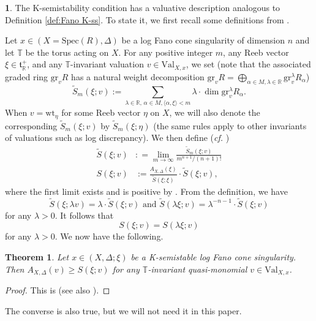 \documentclass[12pt]{amsart}
\newtheorem{thm}[prop]{Theorem}
\theoremstyle{definition}
\newtheorem{emp}[prop]{}
\newcommand{\bR}{\mathbb{R}}
\newcommand{\bT}{\mathbb{T}}
\newcommand{\tS}{\widetilde{S}}
\newcommand{\ft}{\mathfrak{t}}
\newcommand{\Spec}{\mathrm{Spec}}
\newcommand{\Val}{\mathrm{Val}}
\newcommand{\gr}{\mathrm{gr}}
\newcommand{\wt}{\mathrm{wt}}
\numberwithin{equation}{section}
\begin{document}
\begin{emp}

The K-semistability condition has a valuative description analogous to Definition \ref{def:Fano K-ss}. To state it, we first recall some definitions from \cite{XZ-uniqueness}.

Let $x\in (X=\Spec(R),\Delta)$ be a log Fano cone singularity of dimension $n$ and let $\bT$ be the torus acting on $X$. For any positive integer $m$, any Reeb vector $\xi\in \ft^+_\bR$, and any $\bT$-invariant valuation $v\in \Val_{X,x}$, we set (note that the associated graded ring $\gr_v R$ has a natural weight decomposition $\gr_v R = \bigoplus_{\alpha\in M,\lambda\in \bR} \gr_v^\lambda R_\alpha$)
\[
\tS_m(\xi;v):=\sum_{\lambda\in\bR,\,\alpha\in M,\langle\alpha,\xi\rangle< m} \lambda\cdot \dim \gr_v^\lambda R_\alpha.
\]
When $v=\wt_\eta$ for some Reeb vector $\eta$ on $X$, we will also denote the corresponding $\tS_m(\xi;v)$ by $\tS_m(\xi;\eta)$ (the same rules apply to other invariants of valuations such as log discrepancy). We then define ({\it cf.} \cite[Section 3.1]{XZ-uniqueness})
\begin{align*}
\tS(\xi;v)& : = \lim_{m\to \infty} \frac{\tS_m(\xi;v)}{m^{n+1}/(n+1)!}\\ 
S(\xi;v) & :=\frac{A_{X,\Delta}(\xi)}{\tS(\xi;\xi)}\cdot \tS(\xi;v),
\end{align*}
where the first limit exists and is positive by \cite[(3.4)]{XZ-uniqueness}. From the definition, we have 
\begin{equation} \label{eq:S tilde homogeneous}
\tS(\xi;\lambda v)=\lambda\cdot \tS(\xi;v)\mbox{ \ \ and \ \ }\tS(\lambda\xi; v)=\lambda^{-n-1}\cdot \tS(\xi;v)
\end{equation}
for any $\lambda>0$. It follows that 
\begin{equation} \label{eq:S scale inv}
S(\xi;v)=S(\lambda\xi;v)
\end{equation}
for any $\lambda>0$. We now have the following.

\begin{thm} \label{thm:minimizer is ss}
Let $x\in (X,\Delta;\xi)$ be a K-semistable log Fano cone singularity. Then $A_{X,\Delta}(v)\ge S(\xi;v)$ for any $\bT$-invariant quasi-monomial $v\in \Val_{X,x}$.
\end{thm}

\begin{proof}
This is \cite[Theorem 3.10]{XZ-uniqueness} (see also \cite[Theorem 1.1]{LX-higher-rank}).
\end{proof}

The converse is also true, but we will not need it in this paper.
\end{emp}
\end{document}
